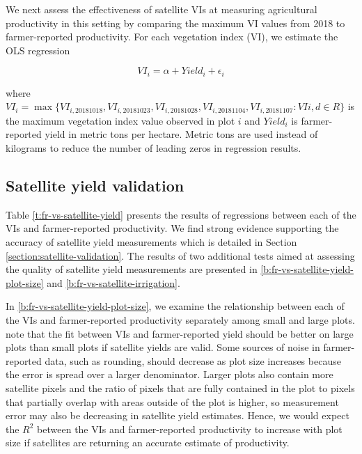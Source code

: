 \documentclass{article}
\begin{document}
We next assess the effectiveness of satellite VIs at measuring agricultural productivity in this setting by comparing the maximum VI values from 2018 to farmer-reported productivity. For each vegetation index (VI), we estimate the OLS regression

$$VI_i = \alpha + Yield_i + \epsilon_i$$   

where $VI_i = \max \lbrace VI_{i,20181018}, VI_{i,20181023},VI_{i,20181028},VI_{i,20181104},VI_{i,20181107} : VI{i,d} \in R\rbrace$ is the maximum vegetation index value observed in plot $i$ and $Yield_i$ is farmer-reported yield in metric tons per hectare. Metric tons are used instead of kilograms to reduce the number of leading zeros in regression results. 

\subsection{Satellite yield validation}

Table \ref{t:fr-vs-satellite-yield} presents the results of regressions between each of the VIs and farmer-reported productivity. We find strong evidence supporting the accuracy of satellite yield measurements which is detailed in Section \ref{section:satellite-validation}. The results of two additional tests aimed at assessing the quality of satellite yield measurements are presented in \ref{b:fr-vs-satellite-yield-plot-size} and \ref{b:fr-vs-satellite-irrigation}. 

In \ref{b:fr-vs-satellite-yield-plot-size}, we examine the relationship between each of the VIs and farmer-reported productivity separately among small and large plots. \citet{Burke2017Satellite-basedSystems} note that the fit between VIs and farmer-reported yield should be better on large plots than small plots if satellite yields are valid. Some sources of noise in farmer-reported data, such as rounding, should decrease as plot size increases because the error is spread over a larger denominator. Larger plots also contain more satellite pixels and the ratio of pixels that are fully contained in the plot to pixels that partially overlap with areas outside of the plot is higher, so measurement error may also be decreasing in satellite yield estimates. Hence, we would expect the $R^2$ between the VIs and farmer-reported productivity to increase with plot size if satellites are returning an accurate estimate of productivity. 
\end{document}
